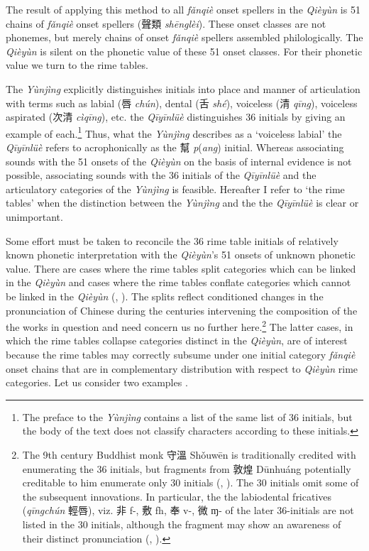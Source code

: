 The result of applying this method to all  \emph{fǎnqiè} onset spellers
in the \emph{Qièyùn} is 51 chains of  \emph{fǎnqiè} onset spellers (聲類
 \emph{shēnglèi}). These onset classes are not phonemes, but merely
chains of onset \emph{fǎnqiè} spellers assembled philologically. The
 \emph{Qièyùn} is silent on the phonetic value of these 51 onset classes.
For their phonetic value we turn to the rime tables.

The  \emph{Yùnjìng} explicitly distinguishes initials into place and
manner of articulation with terms such as labial (唇 \emph{chún}),
dental (舌 \emph{shé}), voiceless (清 \emph{qīng}), voiceless aspirated
(次清 \emph{cìqīng}), etc. the \emph{Qīyīnlüè} distinguishes 36 initials
by giving an example of each.\footnote{The preface to the  \emph{Yùnjìng}
  contains a list of the same list of 36 initials, but the body of the
  text does not classify characters according to these initials.} Thus,
what the  \emph{Yùnjìng} describes as a `voiceless labial' the
 \emph{Qīyīnlüè} refers to acrophonically as the 幫 \emph{p}(\emph{ang})
initial. Whereas associating sounds with the 51 onsets of the
 \emph{Qièyùn} on the basis of internal evidence is not possible,
associating sounds with the 36 initials of the \emph{Qīyīnlüè} and the
articulatory categories of the \emph{Yùnjìng} is feasible. Hereafter I
refer to `the rime tables' when the distinction between the
 \emph{Yùnjìng} and the the \emph{Qīyīnlüè} is clear or unimportant.

Some effort must be taken to reconcile the 36 rime table initials of
relatively known phonetic interpretation with the  \emph{Qièyùn}'s 51
onsets of unknown phonetic value. There are cases where the rime tables
split cat­e­gories which can be linked in the  \emph{Qièyùn} and cases
where the rime tables conflate categories which cannot be linked in the
 \emph{Qièyùn} (\cite[45-61]{Baxter1992}, 
 \cite[14-16]{Baxter2014OldChinese}). The
splits reflect conditioned changes in the pronunciation of Chinese
during the centuries intervening the composition of the the works in
question and need concern us no further here.\footnote{The 9th century
  Buddhist monk 守溫 Shǒuwēn is traditionally credited with enumerating
  the 36 initials, but fragments from 敦煌 Dūnhuáng potentially
  creditable to him enumerate only 30 initials (\cite[206-207]{Pulleyblank1970LateMC}, 
  \cite{Coblin2006reflections}). The 30 initials omit some of the subsequent
  innovations. In particular, the the labiodental fricatives
  (\emph{qīngchún} 輕唇), viz. 非 f-, 敷 fh, 奉 v-, 微 ɱ- of the later
  36-initials \citep[41, 46-47]{Baxter1992}
  are not listed in the 30
  initials, although the fragment may show an awareness of their
  distinct pronunciation (\cite[210]{Pulleyblank1970LateMC}, 
  \cite[118]{Coblin2006reflections}). }
The latter cases, in which the rime tables collapse categories distinct
in the \emph{Qièyùn}, are of interest because the rime tables may
correctly subsume under one initial category  \emph{fǎnqiè} onset chains
that are in com­ple­men­tary distribution with respect to \emph{Qièyùn}
rime categories. Let us consider two examples \citep[112-114]{Tang2002}. 

